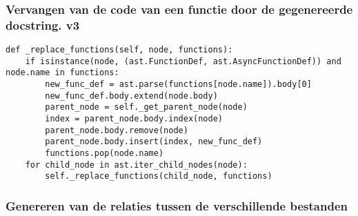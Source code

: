 \subsubsection{Vervangen van de code van een functie door de gegenereerde docstring. v3}
\label{bijlage:vervangen-v3}
\begin{verbatim}
def _replace_functions(self, node, functions):
    if isinstance(node, (ast.FunctionDef, ast.AsyncFunctionDef)) and node.name in functions:
        new_func_def = ast.parse(functions[node.name]).body[0]
        new_func_def.body.extend(node.body)
        parent_node = self._get_parent_node(node)
        index = parent_node.body.index(node)
        parent_node.body.remove(node)
        parent_node.body.insert(index, new_func_def)
        functions.pop(node.name)
    for child_node in ast.iter_child_nodes(node):
        self._replace_functions(child_node, functions)
\end{verbatim}

\subsubsection{Genereren van de relaties tussen de verschillende bestanden}
\label{bijlage:generate-file-relations}

